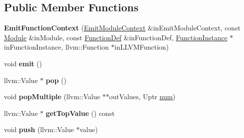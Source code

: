 \subsection*{Public Member Functions}
\begin{DoxyCompactItemize}
\item 
\mbox{\label{struct_l_l_v_m_j_i_t_1_1_emit_function_context_aa3bb40ecf1ca599acf613f16bd9f93a5}} 
{\bfseries Emit\+Function\+Context} (\mbox{\hyperlink{struct_l_l_v_m_j_i_t_1_1_emit_module_context}{Emit\+Module\+Context}} \&in\+Emit\+Module\+Context, const \mbox{\hyperlink{struct_i_r_1_1_module}{Module}} \&in\+Module, const \mbox{\hyperlink{struct_i_r_1_1_function_def}{Function\+Def}} \&in\+Function\+Def, \mbox{\hyperlink{struct_runtime_1_1_function_instance}{Function\+Instance}} $\ast$in\+Function\+Instance, llvm\+::\+Function $\ast$in\+L\+L\+V\+M\+Function)
\item 
\mbox{\label{struct_l_l_v_m_j_i_t_1_1_emit_function_context_a43f6c288592bac076fdd0f858b6abe1c}} 
void {\bfseries emit} ()
\item 
\mbox{\label{struct_l_l_v_m_j_i_t_1_1_emit_function_context_a5222e2492818a73f6b849ad34b7b5dbc}} 
llvm\+::\+Value $\ast$ {\bfseries pop} ()
\item 
\mbox{\label{struct_l_l_v_m_j_i_t_1_1_emit_function_context_a8357e12f1f3596b7590c99487bdd008a}} 
void {\bfseries pop\+Multiple} (llvm\+::\+Value $\ast$$\ast$out\+Values, Uptr \mbox{\hyperlink{structnum}{num}})
\item 
\mbox{\label{struct_l_l_v_m_j_i_t_1_1_emit_function_context_a00990a3a210c6b994c84b3d5918f1d63}} 
llvm\+::\+Value $\ast$ {\bfseries get\+Top\+Value} () const
\item 
\mbox{\label{struct_l_l_v_m_j_i_t_1_1_emit_function_context_a97190e0dec065dc9eb3b3c8343800eb5}} 
void {\bfseries push} (llvm\+::\+Value $\ast$value)
\item 
\mbox{\label{struct_l_l_v_m_j_i_t_1_1_emit_function_context_a92a067936162fa6ab6fddef5352d3168}} 
$$
\end{DoxyCompactItemize}
